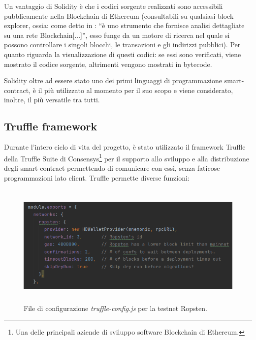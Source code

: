 Un vantaggio di Solidity è che i codici sorgente realizzati sono accessibili pubblicamente nella Blockchain di Ethereum (consultabili su qualsiasi block explorer, ossia: come detto in \cite{block_explorer}: “è uno strumento che fornisce analisi dettagliate su una rete Blockchain[...]”, esso funge da un motore di ricerca  nel quale si possono controllare i singoli blocchi, le transazioni e gli indirizzi pubblici). Per quanto riguarda la visualizzazione di questi codici: se essi sono verificati, viene mostrato il codice sorgente, altrimenti vengono mostrati in bytecode.

Solidity oltre ad essere stato uno dei primi linguaggi di programmazione smart-contract, è il più utilizzato al momento per il suo scopo e viene considerato, inoltre, il più versatile tra tutti.
\subsection{Truffle framework}\label{Truffle}
Durante l'intero ciclo di vita del progetto, è stato utilizzato il framework Truffle della Truffle Suite di Consensys\footnote{Una delle principali aziende di sviluppo software Blockchain di Ethereum.}\cite{Truffle_Suite} per il supporto allo sviluppo e alla distribuzione degli smart-contract permettendo di comunicare con essi, senza faticose programmazioni lato client. Truffle permette diverse funzioni:
\begin{figure}[h]
    \centering
    \includegraphics[width=13cm,height=6cm]{Immagini/truffle_config.png}
    \caption[File di configurazione truffle-config.js]{File di configurazione \textit{truffle-config.js} per la testnet Ropsten.}
    \label{truffle_config}
\end{figure}
